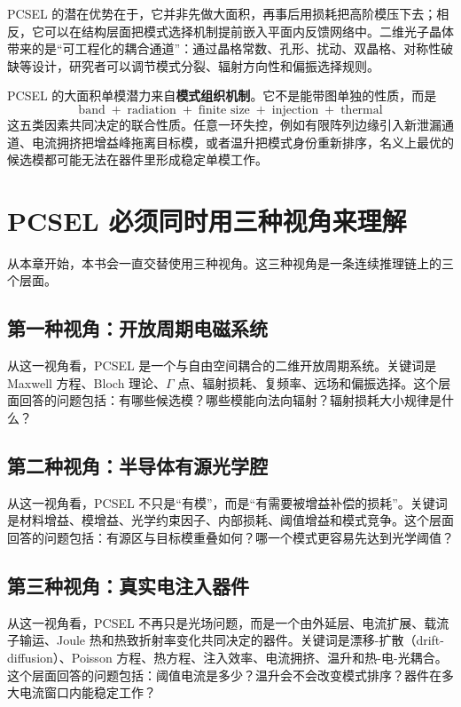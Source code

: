 PCSEL 的潜在优势在于，它并非先做大面积，再事后用损耗把高阶模压下去；相反，它可以在结构层面把模式选择机制提前嵌入平面内反馈网络中。二维光子晶体带来的是“可工程化的耦合通道”：通过晶格常数、孔形、扰动、双晶格、对称性破缺等设计，研究者可以调节模式分裂、辐射方向性和偏振选择规则。

PCSEL 的大面积单模潜力来自\textbf{模式组织机制}。它不是能带图单独的性质，而是
\[
\text{band}
\;+\;
\text{radiation}
\;+\;
\text{finite size}
\;+\;
\text{injection}
\;+\;
\text{thermal}
\]
这五类因素共同决定的联合性质。任意一环失控，例如有限阵列边缘引入新泄漏通道、电流拥挤把增益峰拖离目标模，或者温升把模式身份重新排序，名义上最优的候选模都可能无法在器件里形成稳定单模工作。

\section{PCSEL 必须同时用三种视角来理解}
从本章开始，本书会一直交替使用三种视角。这三种视角是一条连续推理链上的三个层面。

\subsection{第一种视角：开放周期电磁系统}
从这一视角看，PCSEL 是一个与自由空间耦合的二维开放周期系统。关键词是 Maxwell 方程、Bloch 理论、$\Gamma$ 点、辐射损耗、复频率、远场和偏振选择。这个层面回答的问题包括：有哪些候选模？哪些模能向法向辐射？辐射损耗大小规律是什么？

\subsection{第二种视角：半导体有源光学腔}
从这一视角看，PCSEL 不只是“有模”，而是“有需要被增益补偿的损耗”。关键词是材料增益、模增益、光学约束因子、内部损耗、阈值增益和模式竞争。这个层面回答的问题包括：有源区与目标模重叠如何？哪一个模式更容易先达到光学阈值？

\subsection{第三种视角：真实电注入器件}
从这一视角看，PCSEL 不再只是光场问题，而是一个由外延层、电流扩展、载流子输运、Joule 热和热致折射率变化共同决定的器件。关键词是漂移-扩散（drift-diffusion）、Poisson 方程、热方程、注入效率、电流拥挤、温升和热-电-光耦合。这个层面回答的问题包括：阈值电流是多少？温升会不会改变模式排序？器件在多大电流窗口内能稳定工作？

